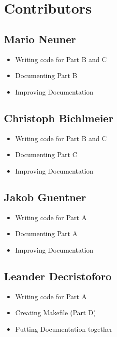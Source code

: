 \documentclass[12pt,a4paper]{article}
\begin{document}
\newpage


\section{Contributors}
\vspace{1cm}

\subsection*{\small Mario Neuner} 
\begin{itemize}
    \item Writing code for Part B and C
    \item Documenting Part B
    \item Improving Documentation
\end{itemize}

\vspace{1cm}

\subsection*{\small Christoph Bichlmeier}
\begin{itemize}
    \item Writing code for Part B and C
    \item Documenting Part C
    \item Improving Documentation
\end{itemize}

\vspace{1cm}

\subsection*{\small Jakob Guentner}
\begin{itemize}
    \item Writing code for Part A
    \item Documenting Part A
    \item Improving Documentation
\end{itemize}

\vspace{1cm}

\subsection*{\small Leander Decristoforo}
\begin{itemize}
    \item Writing code for Part A
    \item Creating Makefile (Part D)
    \item Putting Documentation together
\end{itemize}
\end{document}
